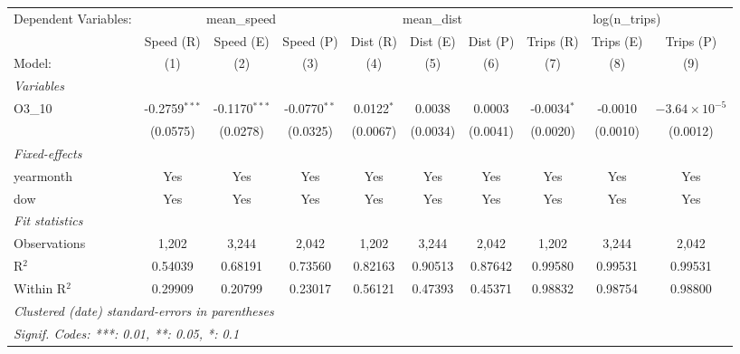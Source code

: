 \begingroup
\centering
\begin{tabular}{lccccccccc}
   \tabularnewline \midrule \midrule
   Dependent Variables: & \multicolumn{3}{c}{mean\_speed} & \multicolumn{3}{c}{mean\_dist} & \multicolumn{3}{c}{log(n\_trips)}\\
                & Speed (R)       & Speed (E)       & Speed (P)      & Dist (R)     & Dist (E) & Dist (P) & Trips (R)     & Trips (E) & Trips (P) \\   
   Model:       & (1)             & (2)             & (3)            & (4)          & (5)      & (6)      & (7)           & (8)       & (9)\\  
   \midrule
   \emph{Variables}\\
   O3\_10       & -0.2759$^{***}$ & -0.1170$^{***}$ & -0.0770$^{**}$ & 0.0122$^{*}$ & 0.0038   & 0.0003   & -0.0034$^{*}$ & -0.0010   & $-3.64\times 10^{-5}$\\    
                & (0.0575)        & (0.0278)        & (0.0325)       & (0.0067)     & (0.0034) & (0.0041) & (0.0020)      & (0.0010)  & (0.0012)\\   
   \midrule
   \emph{Fixed-effects}\\
   yearmonth    & Yes             & Yes             & Yes            & Yes          & Yes      & Yes      & Yes           & Yes       & Yes\\  
   dow          & Yes             & Yes             & Yes            & Yes          & Yes      & Yes      & Yes           & Yes       & Yes\\  
   \midrule
   \emph{Fit statistics}\\
   Observations & 1,202           & 3,244           & 2,042          & 1,202        & 3,244    & 2,042    & 1,202         & 3,244     & 2,042\\  
   R$^2$        & 0.54039         & 0.68191         & 0.73560        & 0.82163      & 0.90513  & 0.87642  & 0.99580       & 0.99531   & 0.99531\\  
   Within R$^2$ & 0.29909         & 0.20799         & 0.23017        & 0.56121      & 0.47393  & 0.45371  & 0.98832       & 0.98754   & 0.98800\\  
   \midrule \midrule
   \multicolumn{10}{l}{\emph{Clustered (date) standard-errors in parentheses}}\\
   \multicolumn{10}{l}{\emph{Signif. Codes: ***: 0.01, **: 0.05, *: 0.1}}\\
\end{tabular}
\par\endgroup
